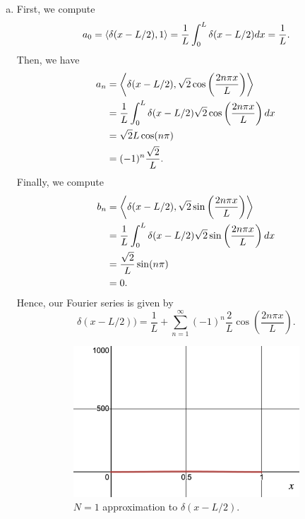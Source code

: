 \documentclass[12pt]{article} %
\begin{document}
\begin{solution}
\begin{enumerate}[(a)]
			\item First, we compute
				\[
				a_0 = \left\langle \delta(x-L/2), 1 \right\rangle = \frac{1}{L} \int_0^L \delta(x-L/2) dx = \frac{1}{L}.
				\]
				Then, we have
				\begin{align*}
				a_n &= \left\langle \delta(x-L/2), \sqrt{2}\cos\left(\frac{2n\pi x}{L}\right) \right\rangle\\
				& = \frac{1}{L} \int_0^L \delta(x-L/2) \sqrt{2}\cos\left(\frac{2n \pi x}{L}\right)dx\\
				&= \sqrt{2}{L} \cos(n\pi)\\
				&= (-1)^n \frac{\sqrt{2}}{L}.
				\end{align*}
				Finally, we compute
				\begin{align*}
					b_n &= \left\langle \delta(x-L/2), \sqrt{2}\sin\left(\frac{2n\pi x}{L}\right) \right\rangle\\
					&= \frac{1}{L} \int_0^L \delta(x-L/2)\sqrt{2}\sin\left(\frac{2n \pi x}{L}\right)dx\\
					&= \frac{\sqrt{2}}{L} \sin(n\pi)\\
					&= 0.
				\end{align*}
				Hence, our Fourier series is given by
				\[
				\boxed{\delta(x-L/2)) = \frac{1}{L} + \sum_{n=1}^\infty (-1)^n \frac{2}{L} \cos\left(\frac{2n\pi x}{L}\right).}
				\]
					\begin{figure}[H]
								\centering
								\begin{subfigure}[h]{0.4\textwidth}
									\includegraphics[width=\textwidth]{Figures/delta_N=1.png}
									\caption{$N=1$ approximation to $\delta(x-L/2)$.}
								\end{subfigure}
								~ 
								\begin{subfigure}[h]{0.4\textwidth}

\end{subfigure}
\end{figure}
\end{enumerate}
\end{solution}
\end{document}
